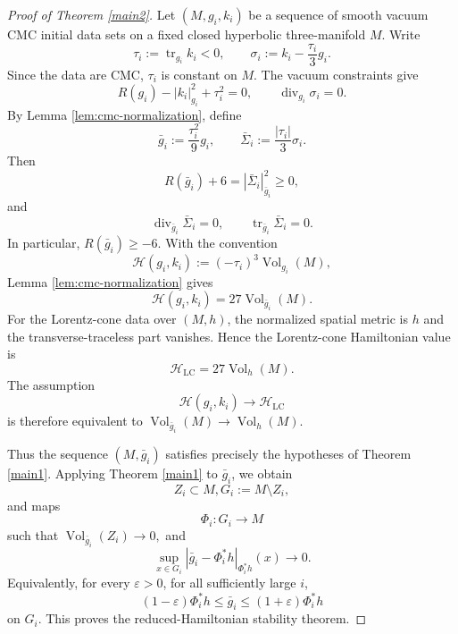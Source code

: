 \documentclass{amsart}
\begin{document}
\begin{proof}[Proof of Theorem \ref{main2}]
Let $(M,g_i,k_i)$ be a sequence of smooth vacuum CMC initial data sets on a fixed closed
hyperbolic three-manifold \(M\).  Write
\[
        \tau_i:=\operatorname{tr}_{g_i}k_i<0,
        \qquad
        \sigma_i:=k_i-\frac{\tau_i}{3}g_i.
\]
Since the data are CMC, \(\tau_i\) is constant on \(M\).  The vacuum
constraints give
\[
        R(g_i)-|k_i|_{g_i}^2+\tau_i^2=0,
        \qquad
        \operatorname{div}_{g_i}\sigma_i=0.
\]
By Lemma \ref{lem:cmc-normalization}, define
\[
        \bar g_i:=\frac{\tau_i^2}{9}g_i,
        \qquad
        \bar\Sigma_i:=\frac{|\tau_i|}{3}\sigma_i.
\]
Then
\[
        R(\bar g_i)+6
        =
        |\bar\Sigma_i|_{\bar g_i}^2\geq0,
\]
and
\[
        \operatorname{div}_{\bar g_i}\bar\Sigma_i=0,
        \qquad
        \operatorname{tr}_{\bar g_i}\bar\Sigma_i=0.
\]
In particular,
$R(\bar g_i)\geq -6$.
With the convention
\[
        \mathcal H(g_i,k_i)
        :=
        (-\tau_i)^3\operatorname{Vol}_{g_i}(M),
\]
Lemma \ref{lem:cmc-normalization} gives
\[
        \mathcal H(g_i,k_i)
        =
        27\operatorname{Vol}_{\bar g_i}(M).
\]
For the Lorentz-cone data over \((M,h)\), the normalized spatial metric is
\(h\) and the transverse-traceless part vanishes.  Hence the Lorentz-cone
Hamiltonian value is
\[
        \mathcal H_{\mathrm{LC}}
        =
        27\operatorname{Vol}_h(M).
\]
The assumption
\[
        \mathcal H(g_i,k_i)\to \mathcal H_{\mathrm{LC}}
\]
is therefore equivalent to
$\operatorname{Vol}_{\bar g_i}(M)\to \operatorname{Vol}_h(M)$.

\noindent Thus the sequence \((M,\bar g_i)\) satisfies precisely the hypotheses of
Theorem \ref{main1}.  Applying Theorem \ref{main1} to \(\bar g_i\), we
obtain 
\[
        Z_i\subset M,
        G_i:=M\setminus Z_i,
\]
and maps
\[
        \Phi_i:G_i\longrightarrow M
\]
such that
$\operatorname{Vol}_{\bar g_i}(Z_i)\to0, 
$
and
\[
        \sup_{x\in G_i}
        \left|
        \bar g_i-\Phi_i^*h
        \right|_{\Phi_i^*h}(x)
        \to0.
\]
Equivalently, for every \(\varepsilon>0\), for all sufficiently large \(i\),
\[
        (1-\varepsilon)\Phi_i^*h
        \leq
        \bar g_i
        \leq
        (1+\varepsilon)\Phi_i^*h
\]
on \(G_i\).
This proves the reduced-Hamiltonian stability theorem.
\end{proof}
\end{document}
